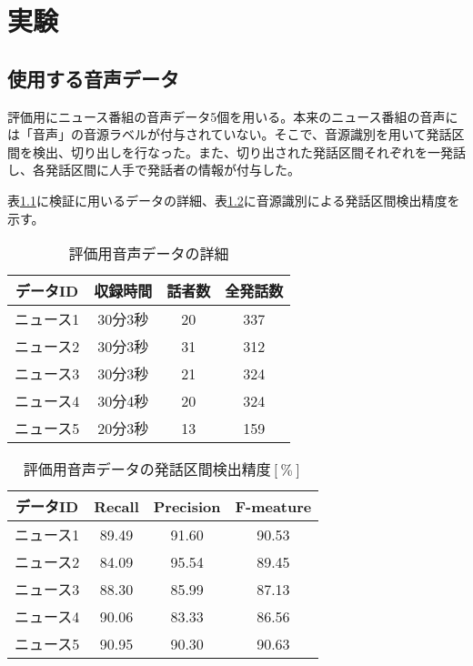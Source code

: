 \chapter{実験}
\section{使用する音声データ}
評価用にニュース番組の音声データ5個を用いる。本来のニュース番組の音声には「音声」の音源ラベルが付与されていない。そこで、音源識別を用いて発話区間を検出、切り出しを行なった。また、切り出された発話区間それぞれを一発話し、各発話区間に人手で発話者の情報が付与した。\par
表\ref{table:test_detail}に検証に用いるデータの詳細、表\ref{table:test_detail_RPF}に音源識別による発話区間検出精度を示す。

\begin{table}[htb]
  \begin{center}
    \caption{評価用音声データの詳細 \label{table:test_detail}}
    \begin{tabular}{|c||c|c|c|} \hline
      データID & 収録時間 & 話者数 & 全発話数 \\ \hline
      ニュース1 & 30分3秒 & 20 & 337 \\ \hline
      ニュース2 & 30分3秒 & 31 & 312\\ \hline
      ニュース3 & 30分3秒 & 21 & 324 \\ \hline
      ニュース4 & 30分4秒 & 20 & 324\\ \hline
      ニュース5 & 20分3秒 & 13 & 159\\ \hline
    \end{tabular}
  \end{center}
\end{table}

\begin{table}[htb]
  \begin{center}
    \caption{評価用音声データの発話区間検出精度$[\%]$ \label{table:test_detail_RPF}}
    \begin{tabular}{|c||c|c|c|} \hline
      データID & Recall & Precision & F-meature \\ \hline
      ニュース1 & 89.49 & 91.60 & 90.53 \\ \hline
      ニュース2 & 84.09 & 95.54 & 89.45\\ \hline
      ニュース3 & 88.30 & 85.99 & 87.13 \\ \hline
      ニュース4 & 90.06 & 83.33 & 86.56\\ \hline
      ニュース5 & 90.95 & 90.30 & 90.63\\ \hline
    \end{tabular}
  \end{center}
\end{table}

